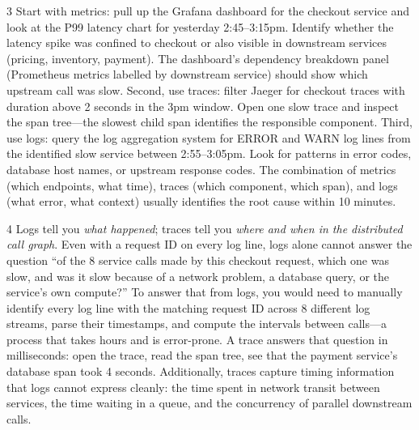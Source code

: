 \documentclass[11pt,a4paper]{article}
\begin{document}
\begin{answerbox}{3}
  Start with metrics: pull up the Grafana dashboard for the checkout service and look at the P99 latency chart for yesterday 2:45--3:15pm. Identify whether the latency spike was confined to checkout or also visible in downstream services (pricing, inventory, payment). The dashboard's dependency breakdown panel (Prometheus metrics labelled by downstream service) should show which upstream call was slow. Second, use traces: filter Jaeger for checkout traces with duration above 2 seconds in the 3pm window. Open one slow trace and inspect the span tree---the slowest child span identifies the responsible component. Third, use logs: query the log aggregation system for ERROR and WARN log lines from the identified slow service between 2:55--3:05pm. Look for patterns in error codes, database host names, or upstream response codes. The combination of metrics (which endpoints, what time), traces (which component, which span), and logs (what error, what context) usually identifies the root cause within 10 minutes.
\end{answerbox}

\begin{answerbox}{4}
  Logs tell you \emph{what happened}; traces tell you \emph{where and when in the distributed call graph}. Even with a request ID on every log line, logs alone cannot answer the question ``of the 8 service calls made by this checkout request, which one was slow, and was it slow because of a network problem, a database query, or the service's own compute?'' To answer that from logs, you would need to manually identify every log line with the matching request ID across 8 different log streams, parse their timestamps, and compute the intervals between calls---a process that takes hours and is error-prone. A trace answers that question in milliseconds: open the trace, read the span tree, see that the payment service's database span took 4 seconds. Additionally, traces capture timing information that logs cannot express cleanly: the time spent in network transit between services, the time waiting in a queue, and the concurrency of parallel downstream calls.
\end{answerbox}
\end{document}
